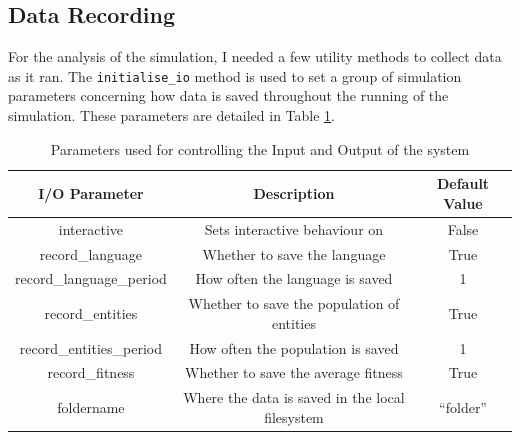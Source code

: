 \documentclass[12pt,a4paper,twoside,openright]{report}
\begin{document}

\subsection{Data Recording}

For the analysis of the simulation, I needed a few utility methods to collect data as it ran. The \texttt{initialise\_io} method is used to set a group of simulation parameters concerning how data is saved throughout the running of the simulation. These parameters are detailed in Table \ref{table:io-params}.

\begin{table}[t]
\centering
 \begin{tabular}{ c | c | c}
 \bf{I/O Parameter} & \bf{Description} & \bf{Default Value} \\ [0.5ex] 
 \hline
interactive & Sets interactive behaviour on & False \\
record\_language & Whether to save the language & True \\
record\_language\_period & How often the language is saved & 1 \\
record\_entities & Whether to save the population of entities & True \\
record\_entities\_period & How often the population is saved & 1 \\
record\_fitness & Whether to save the average fitness & True \\
foldername & Where the data is saved in the local filesystem & ``folder'' \\
\end{tabular}
\caption{Parameters used for controlling the Input and Output of the system}
\label{table:io-params}
\end{table}
\end{document}
